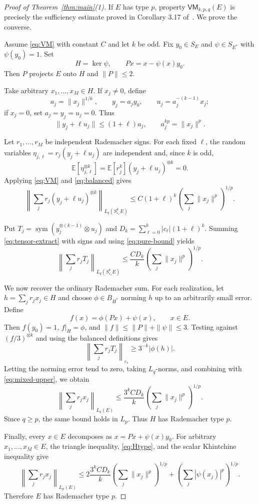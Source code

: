 \documentclass[11pt]{article}
\newcommand{\E}{\mathbb E}
\newcommand{\sym}{\operatorname{sym}}
\newcommand{\epss}{\varepsilon_s}
\begin{document}
\begin{proof}[Proof of Theorem~\ref{thm:main}(1)]
If $E$ has type $p$, property $\mathsf{VM}_{k,p,q}(E)$ is precisely the
sufficiency estimate proved in Corollary 3.17 of~\cite{KS}.  We prove the
converse.

Assume \eqref{eq:VM} with constant $C$ and let $k$ be odd.  Fix
$y_0\in S_E$ and $\psi\in S_{E^*}$ with $\psi(y_0)=1$.  Set
\[
 H=\ker\psi,
 \qquad P x=x-\psi(x)y_0.
\]
Then $P$ projects $E$ onto $H$ and $\|P\|\le2$.

Take arbitrary $x_1,\ldots,x_M\in H$.  If $x_j\ne0$, define
\[
 a_j=\|x_j\|^{1/k},\qquad
 y_j=a_jy_0,\qquad
 u_j=a_j^{-(k-1)}x_j;
\]
if $x_j=0$, set $a_j=y_j=u_j=0$.  Thus
\begin{equation}\label{eq:balanced}
 \|y_j+\ell u_j\|\le(1+\ell)a_j,
 \qquad a_j^{kp}=\|x_j\|^p.
\end{equation}

Let $r_1,\ldots,r_M$ be independent Rademacher signs.  For each fixed
$\ell$, the random variables
$\eta_{j,\ell}=r_j(y_j+\ell u_j)$ are independent and, since $k$ is odd,
\[
 \E[\eta_{j,\ell}^{\otimes k}]
 =\E[r_j^k](y_j+\ell u_j)^{\otimes k}=0.
\]
Applying \eqref{eq:VM} and \eqref{eq:balanced} gives
\begin{equation}\label{eq:pure-bound}
 \left\|\sum_jr_j(y_j+\ell u_j)^{\otimes k}\right\|_{L_q(S^k_{\epss}E)}
 \le C(1+\ell)^k
 \left(\sum_j\|x_j\|^p\right)^{1/p}.
\end{equation}

Put $T_j=\sym(y_j^{\otimes(k-1)}\otimes u_j)$ and
$D_k=\sum_{\ell=0}^k|c_\ell|(1+\ell)^k$.  Summing
\eqref{eq:tensor-extract} with signs and using \eqref{eq:pure-bound} yields
\begin{equation}\label{eq:mixed-upper}
 \left\|\sum_jr_jT_j\right\|_{L_q(S^k_{\epss}E)}
 \le \frac{CD_k}{k}
 \left(\sum_j\|x_j\|^p\right)^{1/p}.
\end{equation}

We now recover the ordinary Rademacher sum.  For each realization, let
$h=\sum_jr_jx_j\in H$ and choose $\phi\in B_{H^*}$ norming $h$ up to an
arbitrarily small error.  Define
\[
 f(x)=\phi(Px)+\psi(x),\qquad x\in E.
\]
Then $f(y_0)=1$, $f|_H=\phi$, and $\|f\|\le\|P\|+\|\psi\|\le3$.
Testing against $(f/3)^{\otimes k}$ and using the balanced definitions gives
\[
 \left\|\sum_jr_jT_j\right\|_{\epss}
 \ge 3^{-k}|\phi(h)|.
\]
Letting the norming error tend to zero, taking $L_q$-norms, and combining
with \eqref{eq:mixed-upper}, we obtain
\begin{equation}\label{eq:Htype}
 \left\|\sum_jr_jx_j\right\|_{L_q(E)}
 \le \frac{3^kCD_k}{k}
 \left(\sum_j\|x_j\|^p\right)^{1/p}.
\end{equation}
Since $q\ge p$, the same bound holds in $L_p$.  Thus $H$ has Rademacher
type $p$.

Finally, every $x\in E$ decomposes as $x=Px+\psi(x)y_0$.  For arbitrary
$x_1,\ldots,x_M\in E$, the triangle inequality, \eqref{eq:Htype}, and the
scalar Khintchine inequality give
\[
 \left\|\sum_jr_jx_j\right\|_{L_p(E)}
 \le 2\frac{3^kCD_k}{k}
       \left(\sum_j\|x_j\|^p\right)^{1/p}
    + \left(\sum_j|\psi(x_j)|^p\right)^{1/p}.
\]
Therefore $E$ has Rademacher type $p$.
\end{proof}
\end{document}
